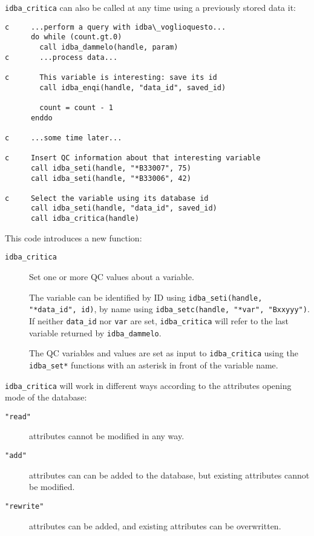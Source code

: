 \documentclass[draft,12pt,a4paper,twoside]{book}
\begin{document}
{\tt idba\_critica} can also be called at any time using a previously stored data it:

\begin{verbatim}
c     ...perform a query with idba\_voglioquesto...
      do while (count.gt.0)
        call idba_dammelo(handle, param)
c       ...process data...

c       This variable is interesting: save its id
        call idba_enqi(handle, "data_id", saved_id)
        
        count = count - 1
      enddo

c     ...some time later...

c     Insert QC information about that interesting variable
      call idba_seti(handle, "*B33007", 75)
      call idba_seti(handle, "*B33006", 42)
      
c     Select the variable using its database id
      call idba_seti(handle, "data_id", saved_id)
      call idba_critica(handle)
\end{verbatim}

This code introduces a new function:

\begin{description}
\item[{\tt idba\_critica}]
  Set one or more QC values about a variable.
  
  The variable can be identified by ID using {\tt idba\_seti(handle, "*data\_id",
  id)}, by name using {\tt idba\_setc(handle, "*var", "Bxxyyy")}.  If neither
  {\tt *data\_id} nor {\tt *var} are set, {\tt idba\_critica} will refer to the last
  variable returned by {\tt idba\_dammelo}.

  The QC variables and values are set as input to {\tt idba\_critica} using the
  {\tt idba\_set*} functions with an asterisk in front of the variable name.
\end{description}


{\tt idba\_critica} will work in different ways according to the attributes
opening mode of the database:

\begin{description}
\item[{\tt "read"}] attributes cannot be modified in any way.
\item[{\tt "add"}] attributes can can be added to the database, but existing
		   attributes cannot be modified.
\item[{\tt "rewrite"}] attributes can be added, and existing attributes can be
                   overwritten.
\end{description}
\end{document}
